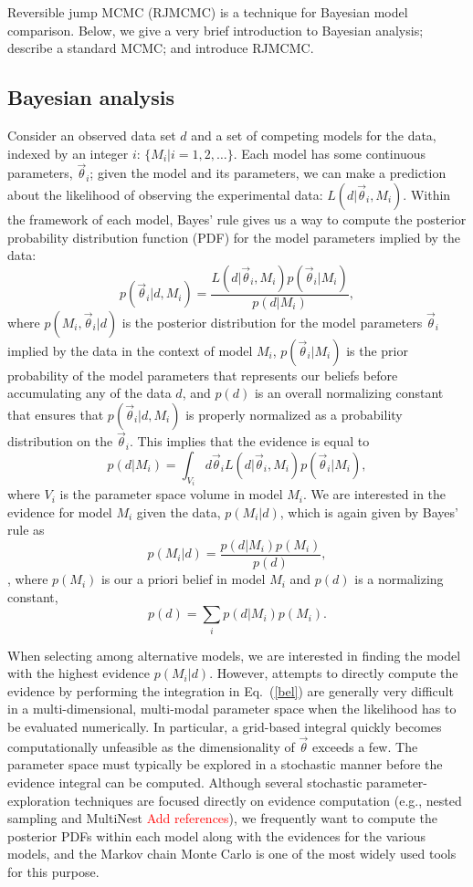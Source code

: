 \documentclass[prd,preprint]{revtex4}
\newcommand{\vtheta}{\vec{\theta}}
\newcommand{\be}{\begin{equation}}
\newcommand{\ee}{\end{equation}}
\newcommand{\bel}[1]{\begin{equation}\label{#1}}
\def\ilya{\textcolor{red}}
\begin{document}
Reversible jump MCMC (RJMCMC) \cite{Green1995} is a technique for Bayesian model comparison.  Below, we give a very brief introduction to Bayesian analysis; describe a standard MCMC; and introduce RJMCMC.

\subsection{Bayesian analysis}

Consider an observed data set $d$ and a set of competing models for the data, indexed by an integer $i$: $\{M_i | i = 1, 2, \ldots \}$.  Each model has some continuous parameters, $\vtheta_i$; given the model and its parameters, we can make a prediction about the likelihood of observing
the experimental data: $L(d|\vtheta_i, M_i)$.  Within the framework of each model, Bayes' rule gives us a way to compute the posterior probability distribution function (PDF) for the model
parameters implied by the data:
\begin{equation}
  p(\vtheta_i | d, M_i) = \frac{L(d|\vtheta_i, M_i) p(\vtheta_i|M_i)}{p(d|M_i)},
\end{equation}
where $p(M_i, \vtheta_i |d)$ is the posterior distribution for the
model parameters $\vtheta_i$ implied by the data in the context of
model $M_i$, $p(\vtheta_i|M_i)$ is the prior
probability of the model parameters that 
represents our beliefs before accumulating any of the data $d$, and
$p(d)$ is an overall normalizing constant that ensures that $p(\vtheta_i|d,M_i)$ is properly normalized as a probability distribution on
the $\vtheta_i$.  This implies that the evidence is equal to
\bel{evidence}
  p(d|M_i) = \int_{V_i} d\vtheta_i L(d|\vtheta_i, M_i) p(\vtheta_i|M_i),
\end{equation}
where $V_i$ is the parameter space volume in model $M_i$.  We are interested in the evidence for model $M_i$ given the data, $p(M_i|d)$, which is again given by Bayes' rule as
\begin{equation}
p(M_i|d) = \frac{p(d|M_i) p(M_i)}{p(d)},
\end{equation},
where $p(M_i)$ is our a priori belief in model $M_i$ and $p(d)$ is a normalizing constant, 
\be
p(d)=\sum_i p(d|M_i) p(M_i).
\ee

When selecting among alternative models, we are interested in finding the model with the highest evidence $p(M_i|d)$.  However, attempts to directly compute the evidence by performing the integration in Eq.~(\ref{bel}) are generally very difficult in a multi-dimensional, multi-modal parameter space when the likelihood has to be evaluated numerically.  In particular, a grid-based integral quickly becomes computationally unfeasible as the dimensionality of $\vtheta$ exceeds a few.  The parameter space must typically be explored in a stochastic manner before the evidence integral can be computed.  Although several stochastic parameter-exploration techniques are focused directly on evidence computation (e.g., nested sampling and MultiNest \ilya {Add references}), we frequently want to compute the posterior PDFs within each model along with the evidences for the various models, and the Markov chain Monte Carlo is one of the most widely used tools for this purpose. 
\end{document}
